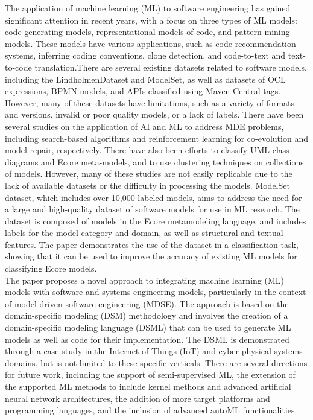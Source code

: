 The application of machine learning (ML) to software engineering has gained significant attention in recent years, with a focus on three types of ML models: code-generating models, representational models of code, and pattern mining models. These models have various applications, such as code recommendation systems, inferring coding conventions, clone detection, and code-to-text and text-to-code translation.There are several existing datasets related to software models, including the LindholmenDataset and ModelSet, as well as datasets of OCL expressions, BPMN models, and APIs classified using Maven Central tags. However, many of these datasets have limitations, such as a variety of formats and versions, invalid or poor quality models, or a lack of labels.
There have been several studies on the application of AI and ML to address MDE problems, including search-based algorithms and reinforcement learning for co-evolution and model repair, respectively. There have also been efforts to classify UML class diagrams and Ecore meta-models, and to use clustering techniques on collections of models. However, many of these studies are not easily replicable due to the lack of available datasets or the difficulty in processing the models.
ModelSet dataset, which includes over 10,000 labeled models, aims to address the need for a large and high-quality dataset of software models for use in ML research. The dataset is composed of models in the Ecore metamodeling language, and includes labels for the model category and domain, as well as structural and textual features. The paper \cite{modelset} demonstrates the use of the dataset in a classification task, showing that it can be used to improve the accuracy of existing ML models for classifying Ecore models.\\


The paper \cite{mdApproach} proposes a novel approach to integrating machine learning (ML) models with software and systems engineering models, particularly in the context of model-driven software engineering (MDSE). The approach is based on the domain-specific modeling (DSM) methodology and involves the creation of a domain-specific modeling language (DSML) that can be used to generate ML models as well as code for their implementation. The DSML is demonstrated through a case study in the Internet of Things (IoT) and cyber-physical systems domains, but is not limited to these specific verticals.
There are several directions for future work, including the support of semi-supervised ML, the extension of the supported ML methods to include kernel methods and advanced artificial neural network architectures, the addition of more target platforms and programming languages, and the inclusion of advanced autoML functionalities.

